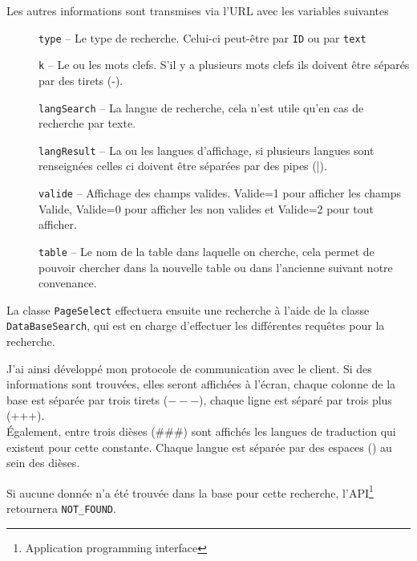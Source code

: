             Les autres informations sont transmises via l'URL avec les variables suivantes
            \begin{description}
                \item[] \texttt{type} -- Le type de recherche. Celui-ci peut-être par \texttt{ID} ou par \texttt{text}
                \item[] \texttt{k} -- Le ou les mots clefs. S'il y a plusieurs mots clefs ils doivent être séparés par des tirets (-).
                \item[] \texttt{langSearch} -- La langue de recherche, cela n'est utile qu'en cas de recherche par texte.
                \item[] \texttt{langResult} -- La ou les langues d'affichage, si plusieurs langues sont renseignées celles ci doivent être séparées par des pipes (|).
                \item[] \texttt{valide} -- Affichage des champs valides. Valide=1 pour afficher les champs Valide, Valide=0 pour afficher les non valides et Valide=2 pour tout afficher.
                \item[] \texttt{table} -- Le nom de la table dans laquelle on cherche, cela permet de pouvoir chercher dans la nouvelle table ou dans l'ancienne suivant notre convenance.                                                                            \end{description}

					La classe \texttt{PageSelect} effectuera ensuite une recherche à l'aide de la classe \texttt{DataBaseSearch}, qui est en charge d'effectuer les différentes requêtes pour la recherche.

           J'ai ainsi développé mon protocole de communication avec le client. Si des informations sont trouvées, elles seront affichées à l'écran, chaque colonne de la base est séparée par trois tirets ($---$), chaque ligne est séparé par trois plus (+++).\\
            \'Egalement, entre trois dièses (\#\#\#) sont affichés les langues de traduction qui existent pour cette constante. Chaque langue est séparée par des espaces (\vs{}) au sein des dièses.

            Si aucune donnée n'a été trouvée dans la base pour cette recherche, l'API\footnote{Application programming interface} retournera \texttt{NOT\_FOUND}.

